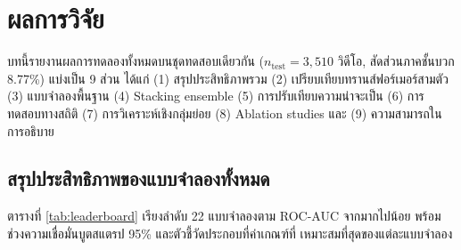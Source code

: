 \chapter{ผลการวิจัย}
\label{ch:results}

บทนี้รายงานผลการทดลองทั้งหมดบนชุดทดสอบเดียวกัน ($n_{\text{test}} = 3{,}510$
วิดีโอ, สัดส่วนภาคชั้นบวก 8.77\%) แบ่งเป็น 9 ส่วน ได้แก่ (1) สรุปประสิทธิภาพรวม
(2) เปรียบเทียบทรานส์ฟอร์เมอร์สามตัว (3) แบบจำลองพื้นฐาน (4) Stacking ensemble
(5) การปรับเทียบความน่าจะเป็น (6) การทดสอบทางสถิติ (7) การวิเคราะห์เชิงกลุ่มย่อย
(8) Ablation studies และ (9) ความสามารถในการอธิบาย

\section{สรุปประสิทธิภาพของแบบจำลองทั้งหมด}
\label{sec:results-leaderboard}

ตารางที่ \ref{tab:leaderboard} เรียงลำดับ 22 แบบจำลองตาม ROC-AUC จากมากไปน้อย
พร้อมช่วงความเชื่อมั่นบูตสแตรป 95\% และตัวชี้วัดประกอบที่ค่าเกณฑ์ที่
เหมาะสมที่สุดของแต่ละแบบจำลอง

